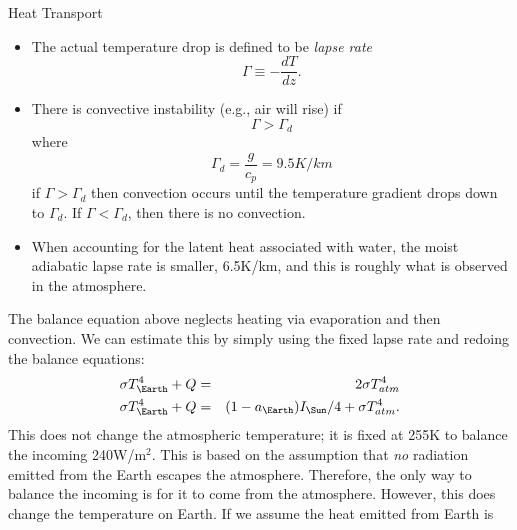 \documentclass[11pt]{book}
\def\be{\begin{equation}}
\def\ee{\end{equation}}
\def\bea{\begin{eqnarray}}
\def\eea{\end{eqnarray}}
\newcommand{\vs}{\nonumber\\}
\newcommand\bei{\begin{itemize}}
\newcommand\eei{\end{itemize}}
\begin{document}
\item Heat Transport
\bei
\item
The actual temperature drop is defined to be {\it lapse rate}
\be
\Gamma \equiv -\frac{dT}{dz}.
\ee
\item There is convective instability (e.g., air will rise) if
\be
\Gamma > \Gamma_d
\ee
where
\be
\Gamma_d = \frac{g}{c_p} = 9.5 K/km
\ee
if $\Gamma>\Gamma_d$ then convection occurs until the temperature gradient drops down to $\Gamma_d$. If $\Gamma< \Gamma_d$, then there is no convection.
\item When accounting for the latent heat associated with water, the moist adiabatic lapse rate is smaller, 6.5K/km, and this is roughly what is observed in the atmosphere.
\eei
The balance equation above neglects heating via evaporation and then convection. We can estimate this by simply using the fixed lapse rate and redoing the balance equations:
\bea
 \sigma T_\Earth^4 + Q&=& 2\sigma T_{atm}^4 \vs
 \sigma T_\Earth^4 + Q&=&  (1-a_\Earth) I_\Sun/4 + \sigma T_{atm}^4 .\eea
 This does not change the atmospheric temperature; it is fixed at 255K to balance the incoming 240W/m$^2$. This is based on the assumption that {\it no} radiation emitted from the Earth escapes the atmosphere. Therefore, the only way to balance the incoming is for it to come from the atmosphere. However, this does change the temperature on Earth. If we assume the heat emitted from Earth is
\end{document}
